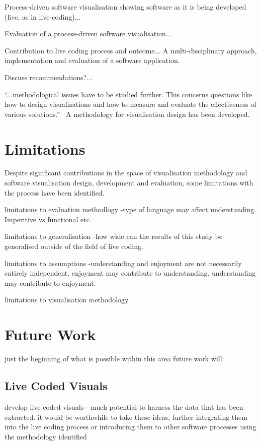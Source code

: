 Process-driven software visualisation showing software as it is being developed (live, as in live-coding)...

Evaluation of a process-driven software visualisation...

Contribution to live coding process and outcome... A multi-disciplinary approach, implementation and evaluation of a software application.

Discuss recommendations?...

``...methodological issues have to be studied further. This concerns questions like how to design visualizations and how to measure and evaluate the effectiveness of various solutions.''~\cite{VanWijk2005} A methodology for visualisation design has been developed.


\section{Limitations}

Despite significant contributions in the space of visualisation methodology and software visualisation design, development and evaluation, some limitations with the process have been identified.

limitations to evaluation methodlogy
-type of language may affect understanding. Imperitive vs functional etc.

limitations to generalisation
-how wide can the results of this study be generalised outside of the field of live coding.

limitations to assumptions
-understanding and enjoyment are not necessarily entirely independent. enjoyment may contribute to understanding. understanding may contribute to enjoyment.

limitations to visualisation methodology

\section{Future Work}

 just the beginning of what is possible within this area
future work will:

\subsection{Live Coded Visuals}

develop live coded visuals - much potential to harness the data that has been extracted. it would be worthwhile to take these ideas, further integrating them into the live coding process or introducing them to other software processes using the methodology identified

